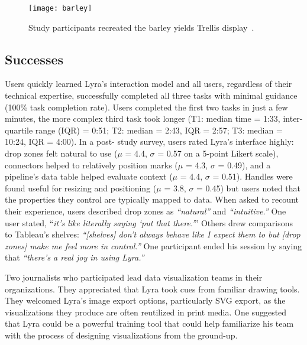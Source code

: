 \begin{figure}[b!]
  \centering
  \texttt{[image: barley]}
  \caption{Study participants recreated the barley yields Trellis
  display~\cite{becker:trellis}.}
  \label{fig:lyra:trellis}
\end{figure}

\vspace{-10pt}

\subsection{Successes}

\vspace{-7pt}

Users quickly learned Lyra's interaction model and all users, regardless of
their technical expertise, successfully completed all three tasks with minimal
guidance (100\% task completion rate). Users completed the first two tasks in
just a few minutes, the more complex third task took longer (T1: median time =
1:33, inter-quartile range (IQR) = 0:51; T2: median = 2:43, IQR = 2:57; T3:
median = 10:24, IQR = 4:00). In a post- study survey, users rated Lyra's
interface highly: drop zones felt natural to use ($\mu$ = 4.4, $\sigma$ = 0.57
on a 5-point Likert scale), connectors helped to relatively position marks
($\mu$ = 4.3, $\sigma$ = 0.49), and a pipeline's data table helped evaluate
context ($\mu$ = 4.4, $\sigma$ = 0.51). Handles were found useful for resizing
and positioning ($\mu$ = 3.8, $\sigma$ = 0.45) but users noted that the
properties they control are typically mapped to data. When asked to recount
their experience, users described drop zones as \emph{``natural''} and
\emph{``intuitive.''} One user stated, ``\emph{it's like \emph{literally} saying
`put that there.'}'' Others drew comparisons to Tableau's shelves:
\emph{``[shelves] don't always behave like I expect them to but [drop zones]
make me feel more in control.''} One participant ended his session by saying
that \emph{``there's a real joy in using Lyra.''}

Two journalists who participated lead data visualization teams in their
organizations. They appreciated that Lyra took cues from familiar drawing tools.
They welcomed Lyra's image export options, particularly SVG export, as the
visualizations they produce are often reutilized in print media. One suggested
that Lyra could be a powerful training tool that could help familiarize his team
with the process of designing visualizations from the ground-up.

